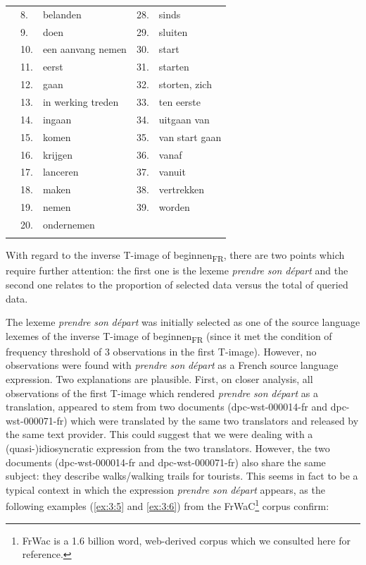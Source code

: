 \begin{table}
\begin{tabularx}{\textwidth}{p{}lXlX}
\rowcolor{lsLightGray}& 8.& belanden & 28.& sinds\\
\rowcolor{lsLightGray}& 9.& doen & 29.& sluiten\\
\rowcolor{lsLightGray}& 10.& een aanvang nemen & 30.& start\\
\rowcolor{lsLightGray}& 11.& eerst & 31.& starten\\
\rowcolor{lsLightGray}& 12.& gaan & 32.& storten, zich\\
\rowcolor{lsLightGray}& 13.& in werking treden & 33.& ten eerste\\
\rowcolor{lsLightGray}& 14.& ingaan & 34.& uitgaan van\\
\rowcolor{lsLightGray}& 15.& komen & 35.& van start gaan\\
\rowcolor{lsLightGray}& 16.& krijgen & 36.& vanaf\\
\rowcolor{lsLightGray}& 17.& lanceren & 37.& vanuit\\
\rowcolor{lsLightGray}& 18.& maken & 38.& vertrekken\\
\rowcolor{lsLightGray}& 19.& nemen & 39.& worden\\
\rowcolor{lsLightGray}& 20.& ondernemen && \\
\lspbottomrule
\end{tabularx}
\end{table}

With regard to the inverse T-image of beginnen\textsubscript{FR}, there are two points which require further attention: the first one is the lexeme \textit{prendre} \textit{son} \textit{départ} and the second one relates to the proportion of selected data versus the total of queried data.

The lexeme \textit{prendre} \textit{son} \textit{départ} was initially selected as one of the source language lexemes of the inverse T-image of beginnen\textsubscript{FR} (since it met the condition of frequency threshold of 3 observations in the first T-image). However, no observations were found with \textit{prendre} \textit{son} \textit{départ} as a French source language expression. Two explanations are plausible. First, on closer analysis, all observations of the first T-image which rendered \textit{prendre} \textit{son} \textit{départ} as a translation, appeared to stem from two documents (dpc-wst-000014-fr and dpc-wst-000071-fr) which were translated by the same two translators and released by the same text provider. This could suggest that we were dealing with a (quasi-)idiosyncratic expression from the two translators. However, the two documents (dpc-wst-000014-fr and dpc-wst-000071-fr) also share the same subject: they describe walks\slash walking trails for tourists. This seems in fact to be a typical context in which the expression \textit{prendre} \textit{son} \textit{départ} appears, as the following examples (\ref{ex:3:5} and \ref{ex:3:6}) from the FrWaC\footnote{FrWac is a 1.6 billion word, web-derived corpus \citep{xiao_web_2010} which we consulted here for reference.} corpus confirm:

